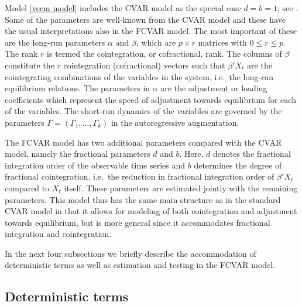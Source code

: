 \documentclass[article]{jss}
\begin{document}
Model \eqref{vecm model} includes the \cite{Johansen1995} CVAR model as the special case $d=b=1$; see \cite{JN2018}. Some of the parameters are well-known from the CVAR model and these have the usual interpretations also in the FCVAR model. The most important of these are the long-run parameters $\alpha$ and $\beta$, which are $p \times r$ matrices with $0 \leq r \leq p$. The rank $r$ is termed the cointegration, or cofractional, rank. The columns of $\beta$ constitute the $r$ cointegration (cofractional) vectors such that $\beta' X_t$ are the cointegrating combinations of the variables in the system, i.e.\ the long-run equilibrium relations. The parameters in $\alpha$ are the adjustment or loading coefficients which represent the speed of adjustment towards equilibrium for each of the variables. The short-run dynamics of the variables are governed by the parameters $\Gamma=(\Gamma _{1},\ldots ,\Gamma _{k})$ in the autoregressive augmentation.

The FCVAR model has two additional parameters compared with the CVAR model, namely the fractional parameters $d$ and $b$. Here, $d$ denotes the fractional integration order of the observable time series and $b$ determines the degree of fractional cointegration, i.e.\ the reduction in fractional integration order of $\beta'X_t$ compared to $X_t$ itself. These parameters are estimated jointly with the remaining parameters. This model thus has the same main structure as in the standard CVAR model in that it allows for modeling of both cointegration and adjustment towards equilibrium, but is more general since it accommodates fractional integration and cointegration.

In the next four subsections we briefly describe the accommodation of deterministic terms as well as estimation and testing in the FCVAR model.

\subsection{Deterministic terms}
\end{document}
